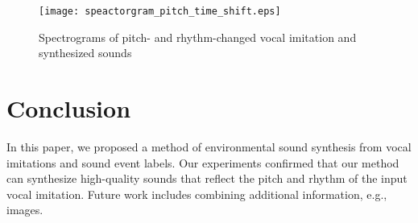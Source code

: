 \documentclass{article}
\begin{document}
%
\begin{figure}[t!]
\centering
\texttt{[image: speactorgram\_pitch\_time\_shift.eps]}
\vspace{-20pt}
\caption{Spectrograms of pitch- and rhythm-changed vocal imitation and synthesized sounds}
\label{fig:spectro_result}
\vspace{-10pt}
\end{figure}
%
%
\vspace{-6pt}
\section{Conclusion}
\label{sec:conclusion}
\vspace{-3pt}
In this paper, we proposed a method of environmental sound synthesis from vocal imitations and sound event labels.
Our experiments confirmed that our method can synthesize high-quality sounds that reflect the pitch and rhythm of the input vocal imitation.
Future work includes combining additional information, e.g., images.



\end{document}
